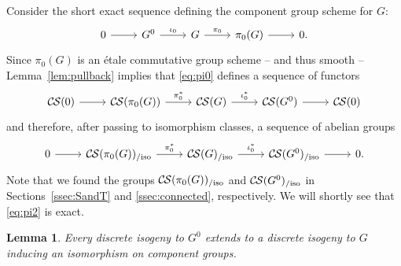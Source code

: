 \documentclass[10pt]{amsart}
\theoremstyle{plain}
\newtheorem{lemma}[theorem]{Lemma}
\theoremstyle{definition}
\newcommand{\CS}{{\mathcal{C\hskip-0.8pt S}}}
\newcommand{\CSiso}[1]{\CS(#1)_{/\text{iso}}}
\begin{document}
Consider the short exact sequence
defining the component group scheme for $G$:
\begin{equation}\label{eq:pi0}
\begin{tikzcd}
0 \rar & G^0 \arrow{r}{\iota_0} & G \arrow{r}{\pi_0} & \pi_0(G) \rar & 0.
\end{tikzcd}
\end{equation}
Since $\pi_0(G)$ is an \'etale commutative group scheme -- and thus smooth --
Lemma~\ref{lem:pullback} implies that \eqref{eq:pi0} defines a sequence of functors
\begin{equation}\label{eq:pi1}
\begin{tikzcd}
\CS(0) \rar & \CS(\pi_0(G)) \arrow{r}{\pi_0^*} & \CS(G) \arrow{r}{\iota_0^*} & \CS(G^0) \rar & \CS(0)
\end{tikzcd}
\end{equation}
and therefore, after passing to isomorphism classes, a sequence of abelian groups
\begin{equation}\label{eq:pi2}
\begin{tikzcd}
0 \rar &
\CSiso{\pi_0(G)} \arrow{r}{\pi_0^*} & \CSiso{G} \arrow{r}{\iota_0^*} & \CSiso{G^0} \rar & 0.
\end{tikzcd}
\end{equation}
 Note that we found the groups $\CSiso{\pi_0(G)}$ and $\CSiso{G^0}$
in Sections~\ref{ssec:SandT} and \ref{ssec:connected}, respectively.
We will shortly see that \eqref{eq:pi2} is exact.


\begin{lemma}\label{lemma:ext}
Every discrete isogeny to $G^0$ extends to a discrete
isogeny to $G$ inducing an isomorphism on component groups.
\end{lemma}
\end{document}
